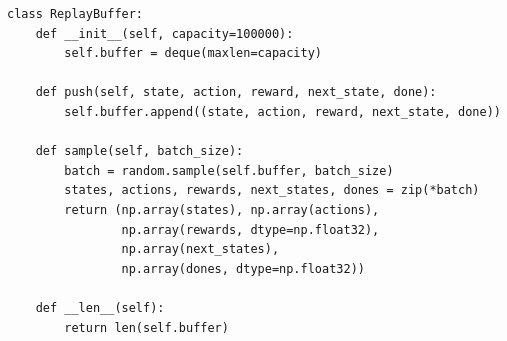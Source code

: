 \begin{codeblock}[title=\textbf{M\'emoire de rejeu}]
\begin{verbatim}
class ReplayBuffer:
    def __init__(self, capacity=100000):
        self.buffer = deque(maxlen=capacity)

    def push(self, state, action, reward, next_state, done):
        self.buffer.append((state, action, reward, next_state, done))

    def sample(self, batch_size):
        batch = random.sample(self.buffer, batch_size)
        states, actions, rewards, next_states, dones = zip(*batch)
        return (np.array(states), np.array(actions),
                np.array(rewards, dtype=np.float32),
                np.array(next_states),
                np.array(dones, dtype=np.float32))

    def __len__(self):
        return len(self.buffer)
\end{verbatim}
\end{codeblock}


